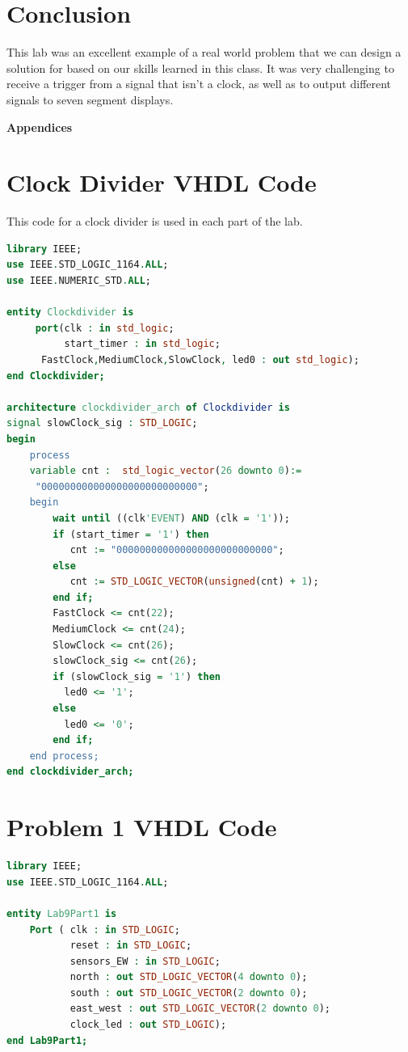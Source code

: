 \documentclass[11pt]{article}
\begin{document}
\section{Conclusion}
This lab was an excellent example of a real world problem that we can design a solution for based on our skills learned in this class. It was very challenging to receive a trigger from a signal that isn't a clock, as well as to output different signals to seven segment displays.

\pagebreak

\textbf{Appendices}

\begin{appendices}

\section{Clock Divider VHDL Code}
This code for a clock divider is used in each part of the lab.

\begin{lstlisting}[language=VHDL]
library IEEE;
use IEEE.STD_LOGIC_1164.ALL;
use IEEE.NUMERIC_STD.ALL;

entity Clockdivider is
     port(clk : in std_logic;
          start_timer : in std_logic;
	  FastClock,MediumClock,SlowClock, led0 : out std_logic);
end Clockdivider;

architecture clockdivider_arch of Clockdivider is
signal slowClock_sig : STD_LOGIC;
begin
    process  
    variable cnt :	std_logic_vector(26 downto 0):=
     "000000000000000000000000000";
    begin					 
        wait until ((clk'EVENT) AND (clk = '1'));
		if (start_timer = '1') then
	       cnt := "000000000000000000000000000";
	    else  
           cnt := STD_LOGIC_VECTOR(unsigned(cnt) + 1);
	    end if;
   	    FastClock <= cnt(22);
   	    MediumClock <= cnt(24);	
   	    SlowClock <= cnt(26);
        slowClock_sig <= cnt(26);
        if (slowClock_sig = '1') then
		  led0 <= '1';
	    else
		  led0 <= '0';
	    end if;
	end process;
end clockdivider_arch;
\end{lstlisting}

\section{Problem 1 VHDL Code}

\begin{lstlisting}[language=VHDL]
library IEEE;
use IEEE.STD_LOGIC_1164.ALL;

entity Lab9Part1 is
    Port ( clk : in STD_LOGIC;
           reset : in STD_LOGIC;
           sensors_EW : in STD_LOGIC;
           north : out STD_LOGIC_VECTOR(4 downto 0);
           south : out STD_LOGIC_VECTOR(2 downto 0);
           east_west : out STD_LOGIC_VECTOR(2 downto 0);
           clock_led : out STD_LOGIC);
end Lab9Part1;


\end{lstlisting}
\end{appendices}
\end{document}
